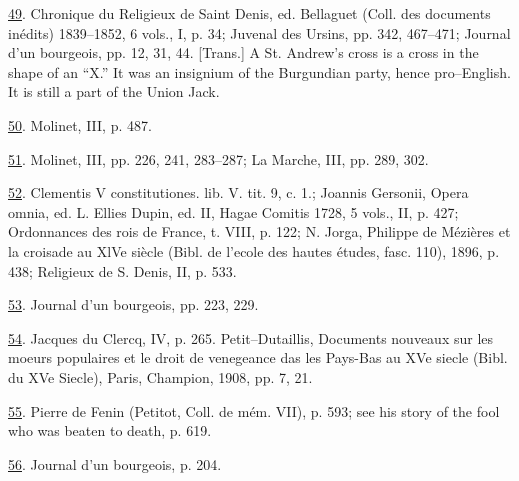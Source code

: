 \protect\hypertarget{23_NOTES.xhtmlux5cux23id_2134}{\protect\hyperlink{08_Chapter_One__THE_PASSIONATE_INTE.xhtmlux5cux23id_2133}{49}}.
Chronique du Religieux de Saint Denis, ed. Bellaguet (Coll. des
documents inédits) 1839--1852, 6 vols., I, p. 34; Juvenal des Ursins,
pp. 342, 467--471; Journal d'un bourgeois, pp. 12, 31, 44. {[}Trans.{]}
A St. Andrew's cross is a cross in the shape of an ``X.'' It was an
insignium of the Burgundian party, hence pro--English. It is still a
part of the Union Jack.

\protect\hypertarget{23_NOTES.xhtmlux5cux23id_2132}{\protect\hyperlink{08_Chapter_One__THE_PASSIONATE_INTE.xhtmlux5cux23id_2131}{50}}.
Molinet, III, p. 487.

\protect\hypertarget{23_NOTES.xhtmlux5cux23id_2130}{\protect\hyperlink{08_Chapter_One__THE_PASSIONATE_INTE.xhtmlux5cux23id_2129}{51}}.
Molinet, III, pp. 226, 241, 283--287; La Marche, III, pp. 289, 302.

\protect\hypertarget{23_NOTES.xhtmlux5cux23id_2128}{\protect\hyperlink{08_Chapter_One__THE_PASSIONATE_INTE.xhtmlux5cux23id_2127}{52}}.
Clementis V constitutiones. lib. V. tit. 9, c. 1.; Joannis Gersonii,
Opera omnia, ed. L. Ellies Dupin, ed. II, Hagae Comitis 1728, 5 vols.,
II, p. 427; Ordonnances des rois de France, t. VIII, p. 122; N. Jorga,
Philippe de Mézières et la croisade au XlVe siècle (Bibl. de l'ecole des
hautes études, fasc. 110), 1896, p. 438; Religieux de S. Denis, II, p.
533.

\protect\hypertarget{23_NOTES.xhtmlux5cux23id_2126}{\protect\hyperlink{08_Chapter_One__THE_PASSIONATE_INTE.xhtmlux5cux23id_2125}{53}}.
Journal d'un bourgeois, pp. 223, 229.

\protect\hypertarget{23_NOTES.xhtmlux5cux23id_2124}{\protect\hyperlink{08_Chapter_One__THE_PASSIONATE_INTE.xhtmlux5cux23id_2123}{54}}.
Jacques du Clercq, IV, p. 265. Petit--Dutaillis, Documents nouveaux sur
les moeurs populaires et le droit de venegeance das les Pays-Bas au XVe
siecle (Bibl. du XVe Siecle), Paris, Champion, 1908, pp. 7, 21.

\protect\hypertarget{23_NOTES.xhtmlux5cux23id_2122}{\protect\hyperlink{08_Chapter_One__THE_PASSIONATE_INTE.xhtmlux5cux23id_2121}{55}}.
Pierre de Fenin (Petitot, Coll. de mém. VII), p. 593; see his story of
the fool who was beaten to death, p. 619.

\protect\hypertarget{23_NOTES.xhtmlux5cux23id_2120}{\protect\hyperlink{08_Chapter_One__THE_PASSIONATE_INTE.xhtmlux5cux23id_2119}{56}}.
Journal d'un bourgeois, p. 204.

